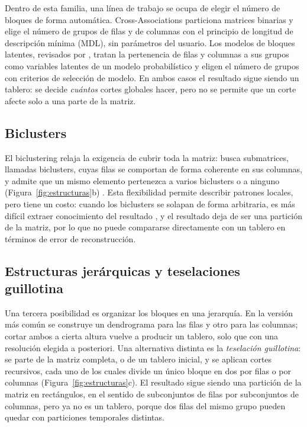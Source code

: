Dentro de esta familia, una línea de trabajo se ocupa de elegir el número de
bloques de forma automática. Cross-Associations \cite{Chakrabarti2004} particiona
matrices binarias y elige el número de grupos de filas y de columnas con el
principio de longitud de descripción mínima (MDL), sin parámetros del usuario. Los
modelos de bloques latentes, revisados por \cite{Biernacki2023}, tratan la
pertenencia de filas y columnas a sus grupos como variables latentes de un modelo
probabilístico y eligen el número de grupos con criterios de selección de modelo.
En ambos casos el resultado sigue siendo un tablero: se decide \emph{cuántos}
cortes globales hacer, pero no se permite que un corte afecte solo a una parte de
la matriz.

\subsection{Biclusters}

El biclustering relaja la exigencia de cubrir toda la matriz: busca submatrices,
llamadas biclusters, cuyas filas se comportan de forma coherente en sus columnas,
y admite que un mismo elemento pertenezca a varios biclusters o a ninguno
(Figura~\ref{fig:estructuras}b) \cite{Castanho2024}. Esta flexibilidad permite
describir patrones locales, pero tiene un costo: cuando los biclusters se solapan
de forma arbitraria, es más difícil extraer conocimiento del resultado
\cite{Castanho2024}, y el resultado deja de ser una partición de la matriz, por lo
que no puede compararse directamente con un tablero en términos de error de
reconstrucción.

\subsection{Estructuras jerárquicas y teselaciones guillotina}

Una tercera posibilidad es organizar los bloques en una jerarquía. En la versión
más común se construye un dendrograma para las filas y otro para las columnas;
cortar ambos a cierta altura vuelve a producir un tablero, solo que con una
resolución elegida a posteriori. Una alternativa distinta es la \emph{teselación
guillotina}: se parte de la matriz completa, o de un tablero inicial, y se aplican
cortes recursivos, cada uno de los cuales divide un único bloque en dos por filas
o por columnas (Figura~\ref{fig:estructuras}c). El resultado sigue siendo una
partición de la matriz en rectángulos, en el sentido de subconjuntos de filas por
subconjuntos de columnas, pero ya no es un tablero, porque dos filas del mismo
grupo pueden quedar con particiones temporales distintas.

